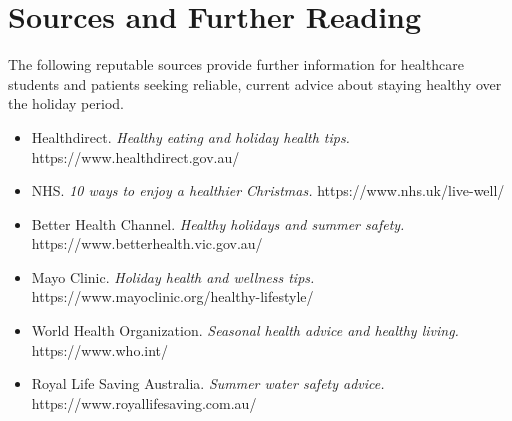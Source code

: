 \section*{Sources and Further Reading}
The following reputable sources provide further information for healthcare students and patients seeking reliable, current advice about staying healthy over the holiday period.

\begin{itemize}
    \item Healthdirect. \textit{Healthy eating and holiday health tips.} https://www.healthdirect.gov.au/
    \item NHS. \textit{10 ways to enjoy a healthier Christmas.} https://www.nhs.uk/live-well/
    \item Better Health Channel. \textit{Healthy holidays and summer safety.} https://www.betterhealth.vic.gov.au/
    \item Mayo Clinic. \textit{Holiday health and wellness tips.} https://www.mayoclinic.org/healthy-lifestyle/
    \item World Health Organization. \textit{Seasonal health advice and healthy living.} https://www.who.int/
    \item Royal Life Saving Australia. \textit{Summer water safety advice.} https://www.royallifesaving.com.au/
\end{itemize}
